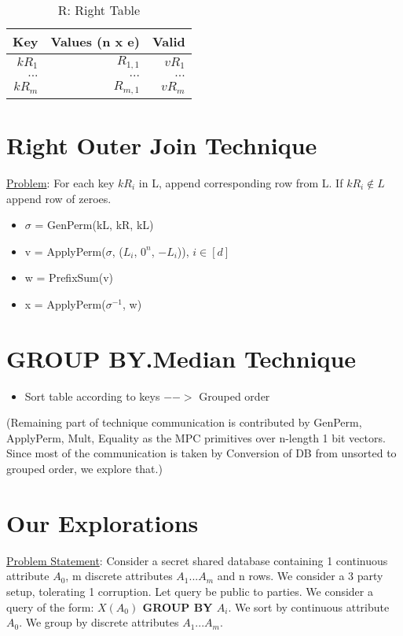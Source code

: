 \begin{table}
	\centering
	\begin{tabular}{ |r|r|r| } 
		\hline
		\textbf{Key} & \textbf{Values (n x e)} & \textbf{Valid} \\ \hline
		$kR_1$  & $R_{1,1}$ & $vR_1$ \\ \hline
		$...$  & $...$ & $...$ \\ \hline
		$kR_m$  & $R_{m,1}$ & $vR_m$ \\ \hline
	\end{tabular}
	\caption{R: Right Table}
\end{table}

\section{Right Outer Join Technique}
\underline{Problem}: For each key $kR_i$ in L, append corresponding row from L. If $kR_i \notin L$ append row of zeroes. 

\begin{itemize}
\item $\sigma$ = GenPerm(kL, kR, kL)
\item v = ApplyPerm($\sigma$, ($L_i$, $0^n$, $-L_i$)), $i \in [d]$
\item w = PrefixSum(v)
\item x = ApplyPerm($\sigma^{-1}$, w)
\end{itemize}

\section{GROUP BY.Median Technique}
\begin{itemize}
\item Sort table according to keys $-->$ Grouped order
\end{itemize}
(Remaining part of technique communication is contributed by GenPerm, ApplyPerm, Mult, Equality as the MPC primitives over n-length 1 bit vectors. Since most of the communication is taken by Conversion of DB from unsorted to grouped order, we explore that.)


\section{Our Explorations}
\underline{Problem Statement}: Consider a secret shared database containing 1 continuous attribute $A_0$, m discrete attributes $A_1 ... A_m$ and n rows. We consider a 3 party setup, tolerating 1 corruption. Let query be public to parties. We consider a query of the form: \textbf{$X(A_0)$ GROUP BY $A_i$}. We sort by continuous attribute $A_0$. We group by discrete attributes $A_1 ... A_m$.

